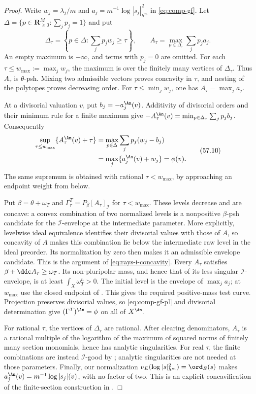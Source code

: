 \begin{proof}
Write $w_j=\lambda_j/m$ and
$a_j=m^{-1}\log|s_j|_{h^m}^2$ in \eqref{eq:comp-gf}.
Let $\Delta=\{p\in\mathbf R_{\geq0}^M:\sum_jp_j=1\}$ and put
\[
 \Delta_\tau=\left\{p\in\Delta:\sum_jp_jw_j\geq\tau\right\},
 \qquad
 A_\tau=\max_{p\in\Delta_\tau}\sum_jp_ja_j.
\tag{57.9}\label{eq:comp-elementary-level}
\]
An empty maximum is $-\infty$, and terms with $p_j=0$ are omitted.
For each $\tau\leq w_{\max}:=\max_jw_j$, the maximum is over the
finitely many vertices of $\Delta_\tau$. Thus $A_\tau$ is
$\theta$-psh. Mixing two admissible vectors proves concavity in
$\tau$, and nesting of the polytopes proves decreasing order.
For $\tau\leq\min_jw_j$, one has $A_\tau=\max_ja_j$.

At a divisorial valuation $v$, put $b_j=-a_j^{\An}(v)$.
Additivity of divisorial orders and their minimum rule for a finite
maximum give $-A_\tau^{\An}(v)=\min_{p\in\Delta_\tau}\sum_jp_jb_j$.
Consequently
\[
 \begin{aligned}
 \sup_{\tau\leq w_{\max}}\{A_\tau^{\An}(v)+\tau\}
 &=\max_{p\in\Delta}\sum_jp_j(w_j-b_j)\\
 &=\max_j\{a_j^{\An}(v)+w_j\}=\phi(v).
 \end{aligned}
\tag{57.10}\label{eq:comp-gf-pl}
\]
The same supremum is obtained with rational $\tau<w_{\max}$,
by approaching an endpoint weight from below.

Put $\beta=\theta+\omega_T$ and
$\Gamma^T_\tau=P_\beta[A_\tau]_{\mathcal I}$ for $\tau<w_{\max}$.
These levels decrease and are concave: a convex combination of two
normalized levels is a nonpositive $\beta$-psh candidate for the
$\mathcal I$-envelope at the intermediate parameter. More explicitly,
levelwise ideal equivalence identifies their divisorial values with those
of $A$, so concavity of $A$ makes this combination lie below the intermediate raw level
in the ideal preorder. Its normalization by zero
then makes it an admissible envelope candidate. This is the argument of
\eqref{eq:rays-i-concavity}.
Every $A_\tau$ satisfies $\beta+\ddc A_\tau\geq\omega_T$.
Its non-pluripolar mass, and hence that of its less singular
$\mathcal I$-envelope, is at least $\int_X\omega_T^n>0$.
The initial level is the envelope of $\max_ja_j$; at $w_{\max}$
use the closed endpoint of .
This gives the required positive-mass test curve.
Projection preserves divisorial values, so \eqref{eq:comp-gf-pl}
and divisorial determination give $(\Gamma^T)^{\An}=\phi$ on
all of $X^{\An}$.

For rational $\tau$, the vertices of $\Delta_\tau$ are rational.
After clearing denominators, $A_\tau$ is a rational multiple of
the logarithm of the maximum of squared norms of finitely many
section monomials, hence has analytic singularities.
For real $\tau$, the finite combinations are instead
$\mathcal I$-good by \cite[Proposition~7.2.1]{XiaBook}; analytic
singularities are not needed at those parameters.
Finally, our normalization
$\nu_E(\log|s|_{h^m}^2)=\ord_E(s)$ makes
$a_j^{\An}(v)=m^{-1}\log|s_j|(v)$, with no factor of two.
This is an explicit concavification of the finite-section
construction in \cite[proof of Theorem~3.12]{DXZ23}.
\end{proof}

